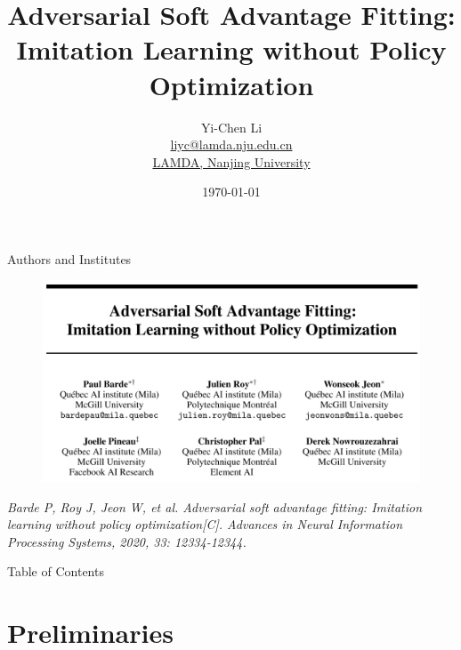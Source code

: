 \documentclass[10pt,aspectratio=169]{beamer}
\title{Adversarial Soft Advantage Fitting: \\ Imitation Learning without Policy Optimization}
\author[Yi-Chen Li]{
    Yi-Chen Li
    \texorpdfstring{\\ \href{mailto:liyc@lamda.nju.edu.cn}{liyc@lamda.nju.edu.cn}}{}
    \texorpdfstring{\\ \href{http://www.lamda.nju.edu.cn/MainPage.ashx}{LAMDA, Nanjing University}}{}
}
\date{\today}
\begin{document}
\frame{\titlepage}


\begin{frame}{Authors and Institutes}
    \begin{figure}
        \centering
        \includegraphics[width=0.6\linewidth]{paper_fig/info.png}
    \end{figure}
    \textit{Barde P, Roy J, Jeon W, et al. Adversarial soft advantage fitting: Imitation learning without policy optimization[C]. Advances in Neural Information Processing Systems, 2020, 33: 12334-12344.}
\end{frame}

\begin{frame}{Table of Contents}
    \tableofcontents
\end{frame}

\section{Preliminaries}
\end{document}
